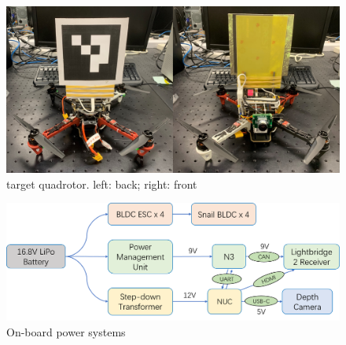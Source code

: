 \begin{figure}[ht]
  \centering
  \includegraphics[width=1.0\textwidth]{figure/chapter_4/target_uav.png}
  \caption{target quadrotor. left: back; right: front}
  \label{fig:target_uav}
\end{figure}

\begin{table}[htb]
  \centering
  \caption{Weight and power consumption of components on the quadrotor}
  \label{tb:weight_power}
\end{table}

\begin{figure}[ht]
  \centering
  \includegraphics[width=1.0\textwidth]{figure/chapter_4/power_system.png}
  \caption{On-board power systems}
  \label{fig:power_systems}
\end{figure}

